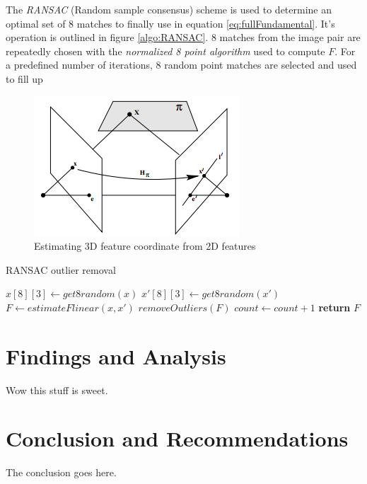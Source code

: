 \documentclass[Conference]{IEEEtran}
\begin{document}
The \textit{RANSAC} (Random sample consensus) scheme is used to determine an optimal set of 8 matches to finally use in equation \ref{eq:fullFundamental}. It's operation is outlined in figure \ref{algo:RANSAC}. 8 matches from the image pair are repeatedly chosen with the \textit{normalized 8 point algorithm} used to compute $F$. For a predefined number of iterations, 8 random point matches are selected and used to fill up 


\begin{figure}
\begin{center}
\includegraphics[scale=0.6]{images/homography.png}
\caption{Estimating 3D feature coordinate from 2D features~\cite{Hartley2004}}
\label{fig:homography}
\end{center}
\end{figure}

\begin{algorithm*}
    \caption{RANSAC outlier removal}
    \begin{algorithmic}[1]
            \State $x[8][3]\gets get8random(x)$
            \State $x'[8][3]\gets get8random(x')$
            \State $F\gets estimateFlinear(x, x')$
            \State $removeOutliers(F)$
            \State $count\gets count+1$
        \EndWhile\label{RANSACOutliers}
        \State \textbf{return} $F$
        \EndProcedure
    \end{algorithmic}
\label{algo:RANSAC}
\end{algorithm*}


\section{Findings and Analysis}
Wow this stuff is sweet.

\section{Conclusion and Recommendations}
The conclusion goes here.

{}

\end{document}

